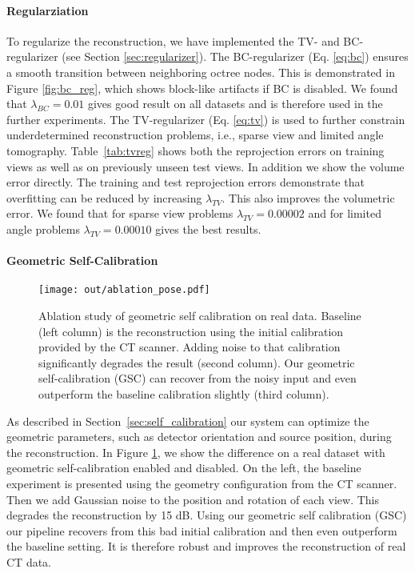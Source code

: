 \documentclass[acmtog,nonacm]{acmart} \acmSubmissionID{0438}
\begin{document}
\paragraph{Regularziation} 
To regularize the reconstruction, we have implemented the TV- and BC-regularizer (see Section \ref{sec:regularizer}).
The BC-regularizer (Eq. \ref{eq:bc}) ensures a smooth transition between neighboring octree nodes. 
This is demonstrated in Figure \ref{fig:bc_reg}, which shows block-like artifacts if BC is disabled.
We found that $\lambda_{BC}=0.01$ gives good result on all datasets and is therefore used in the further experiments.
The TV-regularizer (Eq. \ref{eq:tv}) is used to further constrain underdetermined reconstruction problems, i.e., sparse view and limited angle tomography.
Table~\ref{tab:tvreg} shows both the reprojection errors on training views as
well as on previously unseen test views. In addition we show the
volume error directly.
The training and test reprojection errors demonstrate that overfitting can be reduced by increasing  $\lambda_{TV}$.
This also improves the  volumetric error.
We found that for sparse view problems $\lambda_{TV}=0.00002$ and for limited angle problems $\lambda_{TV}=0.00010$  gives the best results.

\paragraph{Geometric Self-Calibration}
\begin{figure}
\texttt{[image: out/ablation\_pose.pdf]}
	\caption{
		Ablation study of geometric self calibration on real data. 
		Baseline (left column) is the reconstruction using the initial calibration provided by the CT scanner.
		Adding noise to that calibration significantly degrades the result (second column).
		Our geometric self-calibration (GSC) can recover from the noisy input and even outperform the baseline calibration slightly (third column).
	}
	\label{fig:pose_opt}
\end{figure}
As described in Section~\ref{sec:self_calibration} our system can optimize the geometric parameters, such as detector orientation and source position, during the reconstruction.
In Figure \ref{fig:pose_opt}, we show the difference on a real dataset with geometric self-calibration enabled and disabled.
On the left, the baseline experiment is presented using the geometry configuration from the CT scanner.
Then we add Gaussian noise to the position and rotation of each view.
This degrades the reconstruction by 15 dB.
Using our geometric self calibration (GSC) our pipeline recovers from this bad initial calibration and then even outperform the baseline setting.
It is therefore robust and improves the reconstruction of real CT data.
\end{document}
